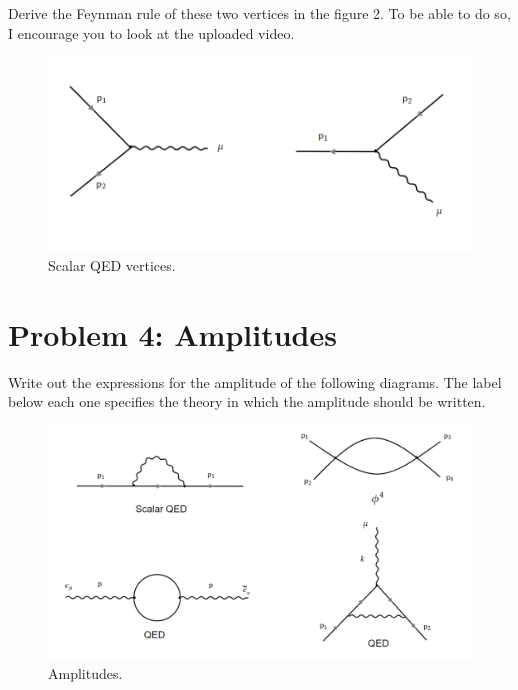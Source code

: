 \documentclass[11pt]{article}
\begin{document}
\begin{problem}
	Derive the Feynman rule of these two vertices in the figure 2. To be able to do so, I encourage you to look at the uploaded video.
	
	\begin{figure}[H]
		\centering
		\includegraphics[width=0.8\linewidth]{img/2.png}
		\caption{Scalar QED vertices.}
	\end{figure}
	
	
\end{problem}

	\section*{Problem 4: Amplitudes}

\begin{problem}
	Write out the expressions for the amplitude of the following diagrams. The label below each one specifies the theory in which the amplitude should be written.
	
	\begin{figure}[H]
		\centering
		\includegraphics[width=0.8\linewidth]{img/3.png}
		\caption{Amplitudes.}
	\end{figure}
	
	
\end{problem}
\end{document}
